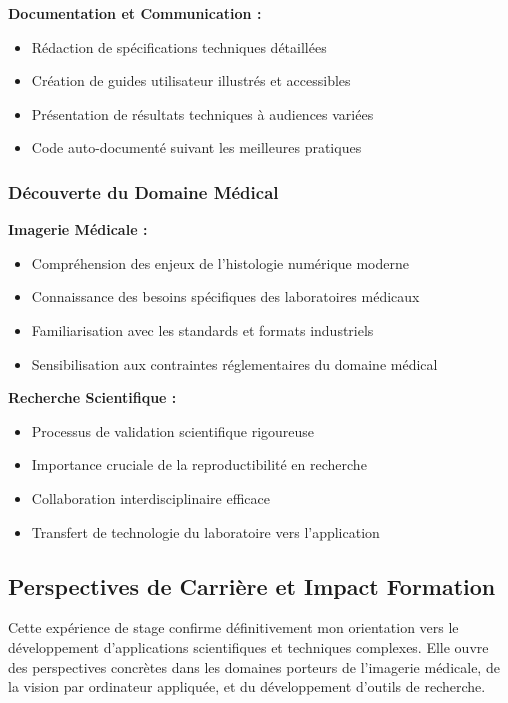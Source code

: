 \documentclass[12pt,a4paper]{article}
\begin{document}
\textbf{Documentation et Communication :}
\begin{itemize}
\item Rédaction de spécifications techniques détaillées
\item Création de guides utilisateur illustrés et accessibles
\item Présentation de résultats techniques à audiences variées
\item Code auto-documenté suivant les meilleures pratiques
\end{itemize}

\subsubsection{Découverte du Domaine Médical}

\textbf{Imagerie Médicale :}
\begin{itemize}
\item Compréhension des enjeux de l'histologie numérique moderne
\item Connaissance des besoins spécifiques des laboratoires médicaux
\item Familiarisation avec les standards et formats industriels
\item Sensibilisation aux contraintes réglementaires du domaine médical
\end{itemize}

\textbf{Recherche Scientifique :}
\begin{itemize}
\item Processus de validation scientifique rigoureuse
\item Importance cruciale de la reproductibilité en recherche
\item Collaboration interdisciplinaire efficace
\item Transfert de technologie du laboratoire vers l'application
\end{itemize}

\subsection{Perspectives de Carrière et Impact Formation}

Cette expérience de stage confirme définitivement mon orientation vers le développement d'applications scientifiques et techniques complexes. Elle ouvre des perspectives concrètes dans les domaines porteurs de l'imagerie médicale, de la vision par ordinateur appliquée, et du développement d'outils de recherche.
\end{document}

